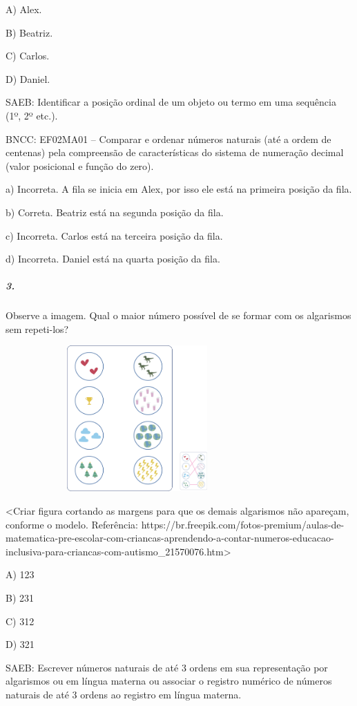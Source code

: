 A) Alex.

B) Beatriz.

C) Carlos.

D) Daniel.

SAEB: Identificar a posição ordinal de um objeto ou termo em uma
sequência (1º, 2º etc.).

BNCC: EF02MA01 -- Comparar e ordenar números naturais (até a ordem de
centenas) pela compreensão de características do sistema de numeração
decimal (valor posicional e função do zero).

a) Incorreta. A fila se inicia em Alex, por isso ele está na primeira posição da fila.

b) Correta. Beatriz está na segunda posição da fila.

c) Incorreta. Carlos está na terceira posição da fila.

d) Incorreta. Daniel está na quarta posição da fila.

\subparagraph{3. }\label{section-102}

Observe a imagem. Qual o maior número possível de se formar com os
algarismos sem repeti-los?

\includegraphics[width=3.96880in,height=2.19793in]{media/image107.png}

\textless{}Criar figura cortando as margens para que os demais
algarismos não apareçam, conforme o modelo. Referência:
https://br.freepik.com/fotos-premium/aulas-de-matematica-pre-escolar-com-criancas-aprendendo-a-contar-numeros-educacao-inclusiva-para-criancas-com-autismo\_21570076.htm\textgreater{}

A) 123

B) 231

C) 312

D) 321

SAEB: Escrever números naturais de até 3 ordens em sua
representação por algarismos ou em língua materna ou associar o registro
numérico de números naturais de até 3 ordens ao registro em língua
materna.

